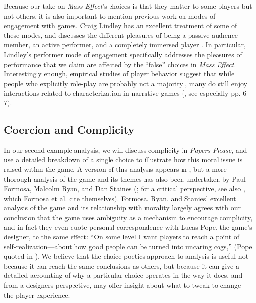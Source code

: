 \documentclass[arts,article,submit,moreauthors,pdftex,10pt,a4paper]{Definitions/mdpi}
\begin{document}
Because our take on \emph{Mass Effect}'s choices is that they matter to some players but not others, it is also important to mention previous work on modes of engagement with games.
%
Craig Lindley has an excellent treatment of some of these modes, and discusses the different pleasures of being a passive audience member, an active performer, and a completely immersed player \citep{lindley2005story}.
%
In particular, Lindley's performer mode of engagement specifically addresses the pleasures of performance that we claim are affected by the ``false'' choices in \emph{Mass Effect}.
%
Interestingly enough, empirical studies of player behavior suggest that while people who explicitly role-play are probably not a majority \citep{lange2014youre}, many do still enjoy interactions related to characterization in narrative games (\cite{mallon2005stand}, see especially pp. 6--7).

\subsection{Coercion and Complicity}

In our second example analysis, we will discuss complicity in \emph{Papers Please}, and use a detailed breakdown of a single choice to illustrate how this moral issue is raised within the game.
%
A version of this analysis appears in \citep{mawhorter2016artificial}, but a more thorough analysis of the game and its themes has also been undertaken by 
Paul Formosa, Malcolm Ryan, and Dan Staines (\citeyear{formosa2016papers}; for a critical perspective, see also \cite{alexander2013designing}, which Formosa et al. cite themselves).
%
Formosa, Ryan, and Stanies' excellent analysis of the game and its relationship with morality largely agrees with our conclusion that the game uses ambiguity as a mechanism to encourage complicity, and in fact they even quote personal correspondence with Lucas Pope, the game's designer, to the same effect: ``On some level I want players to reach a point of self-realization---about how good people can be turned into uncaring cogs,'' (Pope quoted in \cite{formosa2016papers}).
%
We believe that the choice poetics approach to analysis is useful not because it can reach the same conclusions as others, but because it can give a detailed accounting of why a particular choice operates in the way it does, and from a designers perspective, may offer insight about what to tweak to change the player experience.
\end{document}
